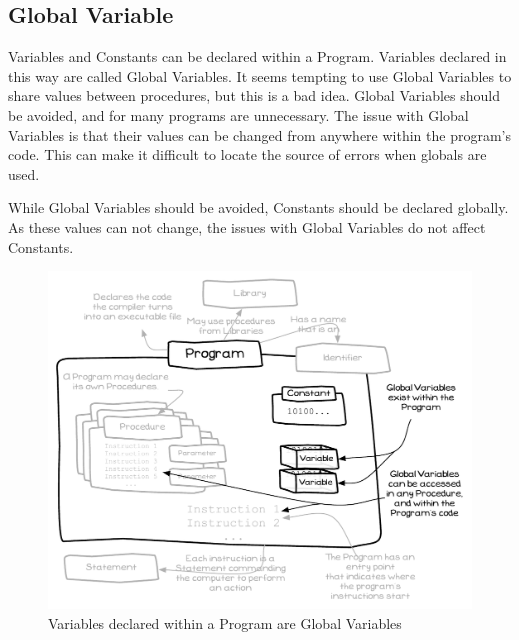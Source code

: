 \clearpage
\subsection{Global Variable} %
\label{sub:global_variable}

Variables and Constants can be declared within a Program. Variables declared in this way are called Global Variables. It seems tempting to use Global Variables to share values between procedures, but this is a bad idea. Global Variables should be avoided, and for many programs are unnecessary. The issue with Global Variables is that their values can be changed from anywhere within the program's code. This can make it difficult to locate the source of errors when globals are used.

While Global Variables should be avoided, Constants should be declared globally. As these values can not change, the issues with Global Variables do not affect Constants. 

\begin{figure}[h]
   \centering
   \includegraphics[width=\textwidth]{./topics/storing-using-data/diagrams/GlobalVariables} 
   \caption{Variables declared within a Program are Global Variables}
   \label{fig:storing-using-data-local-variables}
\end{figure}

